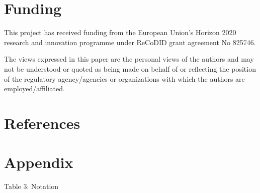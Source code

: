 \documentclass[
]{jss}
\begin{document}
\hypertarget{funding}{%
\section{Funding}\label{funding}}

This project has received funding from the European Union's Horizon 2020
research and innovation programme under ReCoDID grant agreement No
825746.

The views expressed in this paper are the personal views of the authors
and may not be understood or quoted as being made on behalf of or
reflecting the position of the regulatory agency/agencies or
organizations with which the authors are employed/affiliated.

\hypertarget{references}{%
\section{References}\label{references}}

\hypertarget{appendix}{%
\section{Appendix}\label{appendix}}

Table 3: Notation
\end{document}
